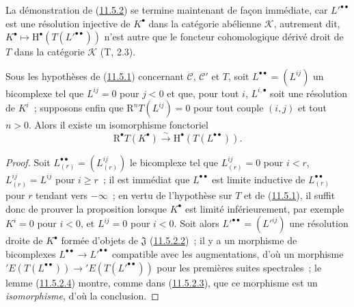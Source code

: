 \begin{env}[11.5.2.5]
\label{0.11.5.2.5-fr}
La démonstration de (\hyperref[0.11.5.2-fr]{11.5.2}) se termine maintenant de
façon immédiate, car $L'^{\bullet\bullet}$ est une résolution injective de
$K^\bullet$ dans la catégorie abélienne $\mathcal K$, autrement dit,
$K^\bullet\mapsto\mathrm H^\bullet(T(L'^{\bullet\bullet}))$ n'est autre que
le foncteur cohomologique dérivé droit de $T$ dans la catégorie $\mathcal K$
(T, 2.3).
\end{env}

\begin{proposition}[11.5.3]
\label{0.11.5.3-fr}
Sous les hypothèses de (\hyperref[0.11.5.1-fr]{11.5.1}) concernant
$\mathcal C$, $\mathcal C'$ et $T$, soit
$L^{\bullet\bullet}=(L^{ij})$ un bicomplexe tel que $L^{ij}=0$ pour $j<0$ et
que, pour tout $i$, $L^{i,\bullet}$ soit une résolution de $K^i$~; supposons
enfin que $\mathrm R^nT(L^{ij})=0$ pour tout couple $(i,j)$ et tout $n>0$.
Alors il existe un isomorphisme fonctoriel
\[
  \label{0.11.5.3.1-fr}
  \mathrm R^\bullet T(K^\bullet)\xrightarrow{\sim}
  \mathrm H^\bullet(T(L^{\bullet\bullet})).
  \tag{11.5.3.1}
\]
\end{proposition}

\begin{proof}
Soit $L_{(r)}^{\bullet\bullet}=(L_{(r)}^{ij})$ le bicomplexe tel que
$L_{(r)}^{ij}=0$ pour $i<r$, $L_{(r)}^{ij}=L^{ij}$ pour $i\geq r$~; il est
immédiat que $L^{\bullet\bullet}$ est limite inductive de
$L_{(r)}^{\bullet\bullet}$ pour $r$ tendant vers $-\infty$~; en vertu de
l'hypothèse sur $T$ et de (\hyperref[0.11.5.1-fr]{11.5.1}), il suffit donc de
prouver la proposition lorsque $K^\bullet$ est limité inférieurement, par
exemple $K^i=0$ pour $i<0$, et $L^{ij}=0$ pour $i<0$. Soit alors
$L'^{\bullet\bullet}=(L'^{ij})$ une résolution droite de $K^\bullet$ formée
d'objets de $\mathfrak J$ (\hyperref[0.11.5.2.2-fr]{11.5.2.2})~; il y a un
morphisme de bicomplexes
$L^{\bullet\bullet}\to L'^{\bullet\bullet}$ compatible avec les
augmentations, d'où un morphisme
$'E(T(L^{\bullet\bullet}))\to{}'E(T(L'^{\bullet\bullet}))$ pour les premières
suites spectrales~; le lemme (\hyperref[0.11.5.2.4-fr]{11.5.2.4}) montre,
comme dans (\hyperref[0.11.5.2.3-fr]{11.5.2.3}), que ce morphisme est un
\emph{isomorphisme}, d'où la conclusion.
\end{proof}

